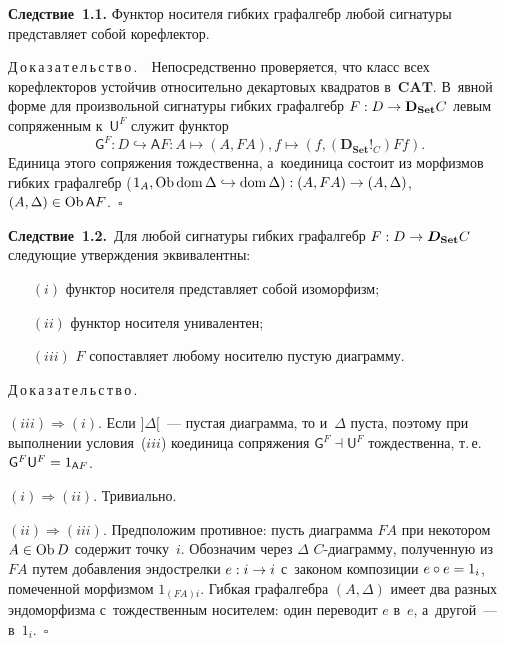 \begin{multicols}{2}
\smallskip

     \noindent
     \textbf{Следствие~1.1.} Функтор носителя гибких графалгебр любой 
сигнатуры представляет собой корефлектор.
     
     \smallskip
     
     \noindent
     Д\,о\,к\,а\,з\,а\,т\,е\,л\,ь\,с\,т\,в\,о\,.\ \ Непосредственно проверяется, что 
класс всех корефлекторов устойчив относительно декартовых квадратов 
в~$\mathbf{CAT}$. В~явной форме для произвольной сигнатуры гибких 
графалгебр $F : D \hm\to \mathbf{D}_{\mathbf{Set}}C$ левым сопряженным 
к~$\mathsf {U}^F$ служит функтор
     $$
     \mathsf {G}^F : D \hookrightarrow  \mathsf {A}F : A 
\mapsto (A, FA), f \mapsto (f, (\mathbf{D}_{\mathbf{Set}}!_C)Ff).
     $$
Единица этого сопряжения тождественна, а~коединица состоит из морфизмов 
гиб\-ких графалгебр ($1_A, \mathrm{Ob}\,\mathrm{dom}\,\Delta   
\hm\hookrightarrow \mathrm{dom}\,\Delta) : (A, FA) \hm\to  (A, \Delta)$, $(A, 
\Delta) \hm\in \mathrm{Ob}\,\mathsf {A}F$.~\hfill$\square$

\smallskip

\noindent
\textbf{Следствие~1.2.}\ Для любой сигнатуры гибких граф\-ал\-гебр $F : D \hm\to 
{\bm D}_{\mathbf{Set}}C$ следующие утверждения эквивалентны:
\begin{itemize}
\item[$(i)$] функтор носителя представляет собой изоморфизм;
\item[$(ii)$] функтор носителя унивалентен;
\item[$(iii)$] $F$ сопоставляет любому носителю пустую диаграмму.
\end{itemize}

     \noindent
     Д\,о\,к\,а\,з\,а\,т\,е\,л\,ь\,с\,т\,в\,о\,.
     
     $(iii)$\;$\Rightarrow$\;$(i)$. Если $]\Delta[$~--- пустая диаграмма, то 
и~$\Delta$ пуста, поэтому при выполнении условия~($iii$) коединица 
сопряжения $\mathsf {G}^F \dashv \mathsf {U}^F$ тождественна, т.\,е.\ 
$\mathsf {G}^F\mathsf {U}^F \hm= 1_{\mathsf {A}F}$.

\vspace*{2pt}
     
     $(i)$\;$\Rightarrow$\;$(ii)$. Тривиально.
     
     \vspace*{2pt}
     
     $(ii)$\;$\Rightarrow$\;$(iii)$. Предположим противное: пусть диаграмма $FA$ 
при некотором $A \hm\in \mathrm{Ob}\, D$ содержит точку~$i$. Обозначим 
через $\Delta$ $C$-диа\-грам\-му, полученную из $FA$ путем добавления 
эндострелки $e : i \hm\to i$ с~законом композиции $e \circ e \hm= 1_i$, 
помеченной морфизмом $1_{(FA)i}$. Гиб\-кая графалгебра $(A, \Delta)$ имеет два 
разных эндоморфизма с~тождественным носителем: один переводит $e$ в~$e$, 
а~другой~--- в~$1_i$.~\hfill$\square$


\end{multicols}
